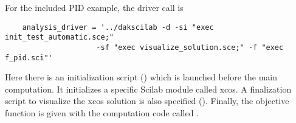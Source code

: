 For the included PID example, the driver call is 
\begin{small}
\begin{verbatim}
    analysis_driver = '../dakscilab -d -si "exec init_test_automatic.sce;"
                     -sf "exec visualize_solution.sce;" -f "exec f_pid.sci"'
\end{verbatim}
\end{small}

Here there is an initialization script
() which is launched before the
main computation. It initializes a specific Scilab module called
xcos. A finalization script to visualize the xcos solution is also
specified (). Finally, the objective
function is given with the computation code called
.



